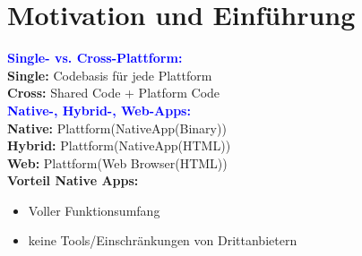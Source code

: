 
\section{Motivation und Einführung}
\textbf{\textcolor{blue}{Single- vs. Cross-Plattform:}}\\
\textbf{Single:} Codebasis für jede Plattform\\
\textbf{Cross:} Shared Code + Platform Code\\
\textbf{\textcolor{blue}{Native-, Hybrid-, Web-Apps:}}\\
\textbf{Native:} Plattform(NativeApp(Binary))\\
\textbf{Hybrid:} Plattform(NativeApp(HTML))\\
\textbf{Web:} Plattform(Web Browser(HTML))\\
\textbf{Vorteil Native Apps:}
\begin{itemize}[topsep=0pt, leftmargin=4mm]
    \setlength\itemsep{-0.3em}
    \item Voller Funktionsumfang
    \item keine Tools/Einschränkungen von Drittanbietern
\end{itemize}